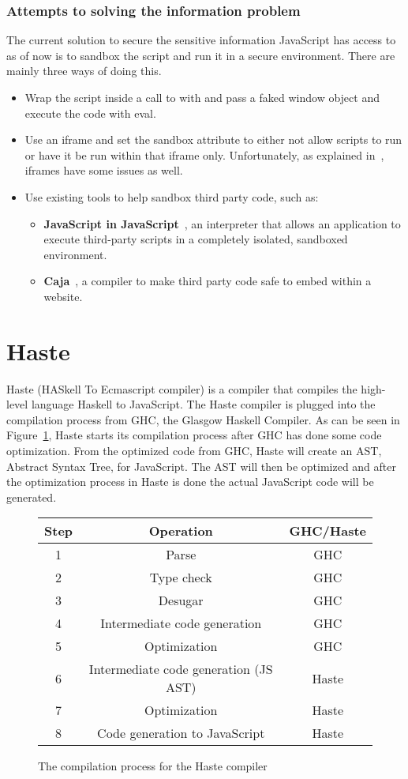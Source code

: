 \subsubsection{Attempts to solving the information problem}
The current solution to secure the sensitive information JavaScript has access to as of now is to sandbox the script and run it in a secure environment. There are mainly three ways of doing this.
\begin{itemize}
  \item Wrap the script inside a call to with and pass a faked window object and execute the code with eval.
  \item Use an iframe and set the sandbox attribute to either not allow scripts to run or have it be run within that iframe only. Unfortunately, as explained in~\cite{js_in_js}, iframes have some issues as well.
  \item Use existing tools to help sandbox third party code, such as:
    \begin{itemize}
      \item \textbf{JavaScript in JavaScript}~\cite{js_in_js}, an interpreter that allows an application to execute third-party scripts in a completely isolated, sandboxed environment.
      \item \textbf{Caja}~\cite{caja_spec}, a compiler to make third party code safe to embed within a website.
    \end{itemize}
\end{itemize}
\section{Haste}
Haste (HASkell To Ecmascript compiler) is a compiler that compiles the high-level language Haskell to JavaScript. The Haste compiler is plugged into the compilation process from GHC, the Glasgow Haskell Compiler. As can be seen in Figure~\ref{fig:system}, Haste starts its compilation process after GHC has done some code optimization. From the optimized code from GHC, Haste will create an AST, Abstract Syntax Tree, for JavaScript. The AST will then be optimized and after the optimization process in Haste is done the actual JavaScript code will be generated.
\begin{figure}[h]
  \begin{tabular}{|c|c|c|}
    \hline
    Step & Operation & GHC/Haste \\
    \hline
    1 & Parse & GHC \\
    2 & Type check & GHC \\
    3 & Desugar & GHC \\
    4 & Intermediate code generation & GHC \\
    5 & Optimization & GHC \\
    6 & Intermediate code generation (JS AST) & Haste \\
    7 & Optimization & Haste \\
    8 & Code generation to JavaScript & Haste \\
    \hline
  \end{tabular}
  \caption{The compilation process for the Haste compiler}
  \label{fig:system}
\end{figure}


